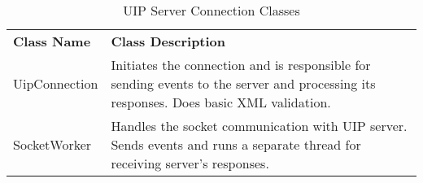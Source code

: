 \begin{table}[htbp]
  \centering
  \caption{UIP Server Connection Classes}
  \label{tab:uipCommClasses}
 \renewcommand{\arraystretch}{1.2}
    \begin{tabularx}{\textwidth}{p{2.5cm}|X}
    \rowcolor{mygray}
    \textbf{Class Name} & \textbf{Class Description} \\
       UipConnection & Initiates the connection and is responsible for sending events to the server and processing its responses. Does basic XML validation. \\ \hline
       SocketWorker & Handles the socket communication with UIP server. Sends events and runs a separate thread for receiving server's responses. \\
    \end{tabularx}%
\end{table}%